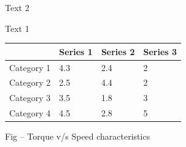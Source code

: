 \documentclass[11pt,a4paper]{article}
\begin{document}
Text 2

Text 1

\begin{figure}[h]
\end{figure}

\begin{figure}[h]
\end{figure}

\begin{table}[h]
\begin{tabular}{|l|l|l|l|}
\hline
 & Series 1 & Series 2 & Series 3 \\ \hline
Category 1 & 4.3 & 2.4 & 2 \\ \hline
Category 2 & 2.5 & 4.4 & 2 \\ \hline
Category 3 & 3.5 & 1.8 & 3 \\ \hline
Category 4 & 4.5 & 2.8 & 5 \\ \hline
\end{tabular}
\end{table}

\begin{figure}[h]
\end{figure}

Fig – Torque v/s Speed characteristics

\begin{figure}[h]
\end{figure}
\end{document}
